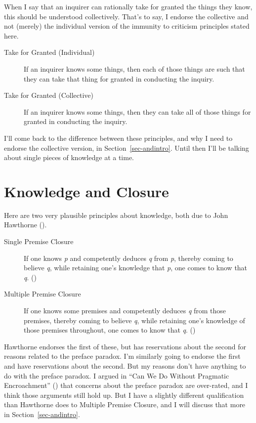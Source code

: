 \documentclass[
  12pt,
  letterpaper,
]{scrbook}
\begin{document}
When I say that an inquirer can rationally take for granted the things
they know, this should be understood collectively. That's to say, I
endorse the collective and not (merely) the individual version of the
immunity to criticism principles stated here.

\begin{description}
\item[Take for Granted (Individual)]
If an inquirer knows some things, then each of those things are such
that they can take that thing for granted in conducting the inquiry.
\item[Take for Granted (Collective)]
If an inquirer knows some things, then they can take all of those things
for granted in conducting the inquiry.
\end{description}

I'll come back to the difference between these principles, and why I
need to endorse the collective version, in Section~\ref{sec-andintro}.
Until then I'll be talking about single pieces of knowledge at a time.

\section{Knowledge and Closure}\label{knowledge-and-closure}

Here are two very plausible principles about knowledge, both due to John
Hawthorne ().

\begin{description}
\item[Single Premise Closure]
If one knows \emph{p} and competently deduces \emph{q} from \emph{p},
thereby coming to believe \emph{q}, while retaining one's knowledge that
\emph{p}, one comes to know that \emph{q}.
()
\item[Multiple Premise Closure]
If one knows some premises and competently deduces \emph{q} from those
premises, thereby coming to believe \emph{q}, while retaining one's
knowledge of those premises throughout, one comes to know that \emph{q}.
()
\end{description}

Hawthorne endorses the first of these, but has reservations about the
second for reasons related to the preface paradox. I'm similarly going
to endorse the first and have reservations about the second. But my
reasons don't have anything to do with the preface paradox. I argued in
``Can We Do Without Pragmatic Encroachment''
() that concerns
about the preface paradox are over-rated, and I think those arguments
still hold up. But I have a slightly different qualification than
Hawthorne does to Multiple Premise Closure, and I will discuss that more
in Section~\ref{sec-andintro}.
\end{document}
